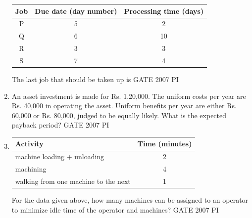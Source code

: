 \documentclass[journal,12pt,onecolumn]{IEEEtran}
\theoremstyle{remark}
\begin{document}
\begin{enumerate}
\begin{center}
\begin{tabular}{|c|c|c|}
\hline
{Job} & {Due date (day number)} & {Processing time (days)} \\
\hline
P & 5 & 2 \\
Q & 6 & 10 \\
R & 3 & 3 \\
S & 7 & 4 \\
\hline
\end{tabular}
\end{center}

The last job that should be taken up is
\hfill{GATE 2007 PI}
\begin{enumerate}
\end{enumerate}

\item 
An asset investment is made for Rs. 1,20,000. The uniform costs per year are Rs. 40,000 in operating the asset. Uniform benefits per year are either Rs. 60,000 or Rs. 80,000, judged to be equally likely. What is the expected payback period?
\hfill{GATE 2007 PI}
\begin{enumerate}
\end{enumerate}
\item 
\begin{center}
\begin{tabular}{|l|c|}
\hline
{Activity} & {Time (minutes)} \\
\hline
machine loading + unloading & 2 \\
machining & 4 \\
walking from one machine to the next & 1 \\
\hline
\end{tabular}
\end{center}

For the data given above, how many machines can be assigned to an operator to minimize 
idle time of the operator and machines?
\hfill{GATE 2007 PI}
\begin{enumerate}
    \end{enumerate}
    

\end{enumerate}
\end{document}
